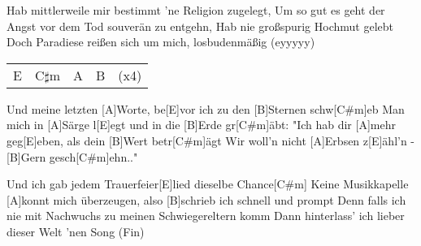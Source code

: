 \begin{guitar}
	Hab mittlerweile mir bestimmt 'ne Religion zugelegt,
	Um so gut es geht der Angst vor dem Tod souverän zu entgehn,
	Hab nie großspurig Hochmut gelebt
	Doch Paradiese reißen sich um mich, losbudenmäßig (eyyyyy)
	
	 
	
	{\footnotesize\begin{tabular}{l|l|l|l l}
			E & C$\sharp$m & A & B & (x4)
	\end{tabular}}
	
	Und meine letzten [A]Worte, be[E]vor ich zu den [B]Sternen schw[C#m]eb
	Man mich in [A]Särge l[E]egt und in die [B]Erde gr[C#m]{ä}bt:
	"Ich hab dir [A]mehr geg[E]eben, als dein [B]Wert betr[C#m]{ä}gt
	Wir woll'n nicht [A]Erbsen z[E]{ä}hl'n - [B]Gern gesch[C#m]ehn.."
	
	Und ich gab jedem Trauerfeier[E]lied dieselbe Chance[C#m]{}
	Keine Musikkapelle [A]konnt mich überzeugen, also [B]schrieb ich schnell und prompt
	Denn falls ich nie mit Nachwuchs zu meinen Schwiegereltern komm
	Dann hinterlass' ich lieber dieser Welt 'nen Song (Fin)
\end{guitar}